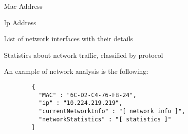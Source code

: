 \begin{description}
  \setlength\itemsep{1em}
  \item [Mac] Mac Address
  \item [Ip] Ip Address 
  \item [CurrentNetworkInfo] List of network interfaces with their details
  \item [NetworkStatistics] Statistics about network traffic, classified by protocol
\end{description}

An example of network analysis is the following:

\begin{description}
	\item 
		\begin{verbatim}
		{
		  "MAC" : "6C-D2-C4-76-FB-24",
		  "ip" : "10.224.219.219",
	 	  "currentNetworkInfo" : "[ network info ]",
	 	  "networkStatistics" : "[ statistics ]"
		}
	\end{verbatim}
\end{description}